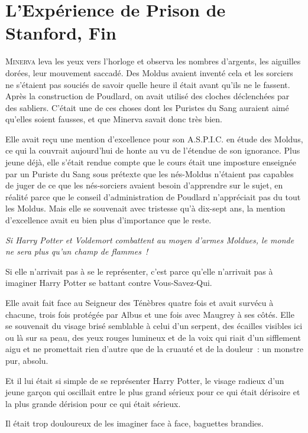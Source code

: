 \chapter{L'Expérience de Prison de Stanford, Fin}

\lettrine{M}{inerva} leva les yeux vers l'horloge et observa les nombres d'argents, les aiguilles dorées, leur mouvement saccadé. Des Moldus avaient inventé cela et les sorciers ne s'étaient pas souciés de savoir quelle heure il était avant qu'ils ne le fassent. Après la construction de Poudlard, on avait utilisé des cloches déclenchées par des sabliers. C'était une de ces choses dont les Puristes du Sang auraient aimé qu'elles soient fausses, et que Minerva savait donc très bien.

Elle avait reçu une mention d'excellence pour son A.S.P.I.C. en étude des Moldus, ce qui la couvrait aujourd'hui de honte au vu de l'étendue de son ignorance. Plus jeune déjà, elle s'était rendue compte que le cours était une imposture enseignée par un Puriste du Sang sous prétexte que les nés-Moldus n'étaient pas capables de juger de ce que les nés-sorciers avaient besoin d'apprendre sur le sujet, en réalité parce que le conseil d'administration de Poudlard n'appréciait pas du tout les Moldus. Mais elle se souvenait avec tristesse qu'à dix-sept ans, la mention d'excellence avait eu bien plus d'importance que le reste.

\emph{Si Harry Potter et Voldemort combattent au moyen d'armes Moldues, le monde ne sera plus qu'un champ de flammes~!}

Si elle n'arrivait pas à se le représenter, c'est parce qu'elle n'arrivait pas à imaginer Harry Potter se battant contre Vous-Savez-Qui.

Elle avait fait face au Seigneur des Ténèbres quatre fois et avait survécu à chacune, trois fois protégée par Albus et une fois avec Maugrey à ses côtés. Elle se souvenait du visage brisé semblable à celui d'un serpent, des écailles visibles ici ou là sur sa peau, des yeux rouges lumineux et de la voix qui riait d'un sifflement aigu et ne promettait rien d'autre que de la cruauté et de la douleur~: un monstre pur, absolu.

Et il lui était si simple de se représenter Harry Potter, le visage radieux d'un jeune garçon qui oscillait entre le plus grand sérieux pour ce qui était dérisoire et la plus grande dérision pour ce qui était sérieux.

Il était trop douloureux de les imaginer face à face, baguettes brandies.

